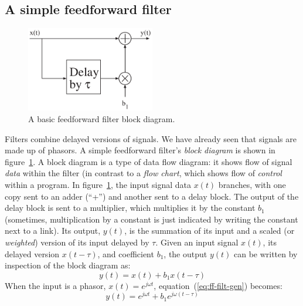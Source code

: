 \subsection{A simple feedforward filter}

\begin{figure}
\centerline{\includegraphics[width=0.5\textwidth]{ch-fir/ff-bdiag}}
\caption{A basic feedforward filter block diagram.
  \label{fig:ff-bdiag}}
\end{figure}

Filters combine delayed versions of signals. We have already seen that
signals are made up of phasors. A simple feedforward filter's
\emph{block diagram} is shown in figure~\ref{fig:ff-bdiag}.
A block diagram is a type of data flow diagram: it shows flow of
signal \emph{data} within the filter (in contrast to a \emph{flow chart}, which
shows flow of \emph{control} within a program. In
figure~\ref{fig:ff-bdiag}, the input signal data $x(t)$ branches, with
one copy sent to an adder (``+'') and another sent to a delay
block. The output of the delay block is sent to a multiplier, which
multiplies it by the constant $b_1$ (sometimes, multiplication by a
constant is just indicated by writing the constant next to a
link). 
Its output, $y(t)$, is the summation of its input and a
scaled (or \emph{weighted}) version of its input delayed by
$\tau$. Given an input signal $x(t)$, its delayed version $x(t-\tau)$,
and coefficient $b_1$, the output $y(t)$ can be written by inspection
of the block diagram as:
\begin{equation}
y(t) = x(t) + b_1 x(t-\tau) \label{eq:ff-filt-gen}
\end{equation}
When the input is a phasor, $x(t) = e^{j\omega t}$,
equation~(\ref{eq:ff-filt-gen}) becomes:
\begin{equation}
y(t)=e^{j\omega t} + b_1 e^{j\omega (t-\tau)}
\label{eq:ff-filt-ph}
\end{equation}

